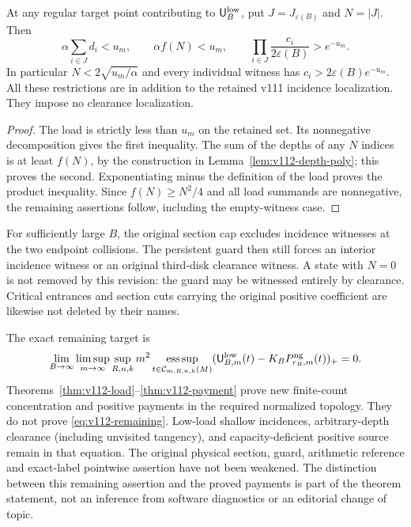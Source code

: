 \begin{corollary}
\label{cor:v112-support}
At any regular target point contributing to $\mathsf U_B^{\rm low}$,
put $J=J_{\varepsilon(B)}$ and $N=|J|$. Then
\begin{equation}\label{eq:v112-support}
 \alpha\sum_{i\in J}d_i<u_m,\qquad
 \alpha f(N)<u_m,\qquad
 \prod_{i\in J}\frac{c_i}{2\varepsilon(B)}>e^{-u_m}.
\end{equation}
In particular $N<2\sqrt{u_m/\alpha}$ and every individual
witness has $c_i>2\varepsilon(B)e^{-u_m}$.
All these restrictions are in addition to the retained v111
incidence localization. They impose no clearance localization.
\end{corollary}
\begin{proof}
The load is strictly less than $u_m$ on the retained set. Its
nonnegative decomposition gives the first inequality. The sum of
the depths of any $N$ indices is at least $f(N)$, by the construction
in Lemma~\ref{lem:v112-depth-poly}; this proves the second. Exponentiating
minus the definition of the load proves the product inequality.
Since $f(N)\ge N^2/4$ and all load summands are nonnegative, the
remaining assertions follow, including the empty-witness case.
\end{proof}

For sufficiently large $B$, the original section cap excludes
incidence witnesses at the two endpoint collisions. The persistent
guard then still forces an interior incidence witness or an original
third-disk clearance witness. A state with $N=0$ is not removed by
this revision: the guard may be witnessed entirely by clearance.
Critical entrances and section cuts carrying the original positive
coefficient are likewise not deleted by their names.

The exact remaining target is
\begin{equation}\label{eq:v112-remaining}
 \lim_{B\to\infty}\limsup_{m\to\infty}\sup_{R,n,k}m^2
 \operatorname*{ess\,sup}_{t\in\mathcal C_{m,R,n,k}(M)}
       (\mathsf U_{B,m}^{\rm low}(t)-K_BP_{r_B,m}^{\rm ng}(t))_+=0.
\end{equation}
Theorems~\ref{thm:v112-load}--\ref{thm:v112-payment} prove new
finite-count concentration and positive payments in the required
normalized topology. They do not prove \eqref{eq:v112-remaining}.
Low-load shallow incidences, arbitrary-depth clearance (including
unvisited tangency), and capacity-deficient positive source remain
in that equation. The original physical section, guard, arithmetic
reference and exact-label pointwise assertion have not been weakened.
The distinction between this remaining assertion and the proved
payments is part of the theorem statement, not an inference from
software diagnostics or an editorial change of topic.
